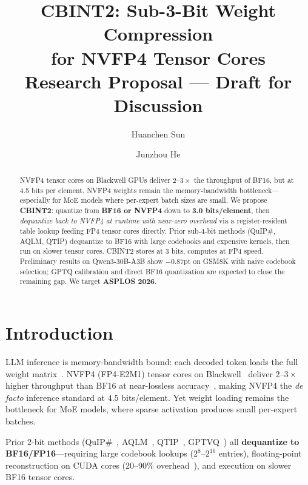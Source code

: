 \documentclass[11pt,a4paper]{article}
\title{\textbf{CBINT2: Sub-3-Bit Weight Compression\\for NVFP4 Tensor Cores}\\[6pt]
\large Research Proposal --- Draft for Discussion}
\author{Huanchen Sun \and Junzhou He}
\date{}
\begin{document}
\maketitle

\begin{abstract}
\begin{sloppypar}
NVFP4 tensor cores on Blackwell GPUs deliver $2\text{--}3\times$ the throughput of BF16, but at 4.5 bits per element, NVFP4 weights remain the memory-bandwidth bottleneck---especially for MoE models where per-expert batch sizes are small.
We propose \textbf{CBINT2}: quantize from \textbf{BF16 or NVFP4} down to \textbf{3.0 bits/element}, then \emph{dequantize back to NVFP4 at runtime with near-zero overhead} via a register-resident table lookup feeding FP4 tensor cores directly.
Prior sub-4-bit methods (QuIP\#, AQLM, QTIP) dequantize to BF16 with large codebooks and expensive kernels, then run on slower tensor cores.
CBINT2 stores at 3 bits, computes at FP4 speed.
Preliminary results on Qwen3-30B-A3B show $-$0.87pt on GSM8K with naive codebook selection; GPTQ calibration and direct BF16 quantization are expected to close the remaining gap.
We target \textbf{ASPLOS 2026}.
\end{sloppypar}
\end{abstract}

\section{Introduction}
\label{sec:intro}

LLM inference is memory-bandwidth bound: each decoded token loads the full weight matrix~\cite{dettmers2023kbit}.
NVFP4 (FP4-E2M1) tensor cores on Blackwell~\cite{nvidia2025nvfp4} deliver $2\text{--}3\times$ higher throughput than BF16 at near-lossless accuracy~\cite{nvidia2026nvfp4accelerates}, making NVFP4 the \emph{de facto} inference standard at 4.5 bits/element.
Yet weight loading remains the bottleneck for MoE models, where sparse activation produces small per-expert batches.

Prior 2-bit methods (QuIP\#~\cite{tseng2024quipsharp}, AQLM~\cite{egiazarian2024aqlm}, QTIP~\cite{tseng2024qtip}, GPTVQ~\cite{vanbaalen2024gptvq}) all \textbf{dequantize to BF16/FP16}---requiring large codebook lookups ($2^{8}$--$2^{16}$ entries), floating-point reconstruction on CUDA cores (20--90\% overhead~\cite{lin2025qserve}), and execution on slower BF16 tensor cores.
\end{document}
